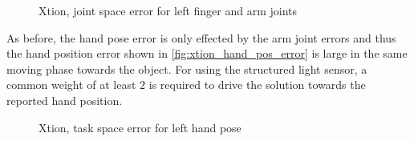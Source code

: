 \begin{figure}
\centering
{}
%
\caption{Xtion, joint space error for left finger and arm joints}
\label{fig:xtion_joint_error}
\end{figure}

As before, the hand pose error is only effected by the arm joint errors and thus the hand position error shown in \cref{fig:xtion_hand_pos_error} is large in the same moving phase towards the object. For using the structured light sensor, a common weight of at least $2$ is required to drive the solution towards the reported hand position.

\begin{figure}
\centering
{}
%
\caption{Xtion, task space error for left hand pose}
\label{fig:xtion_hand_pose_error}
\end{figure}

